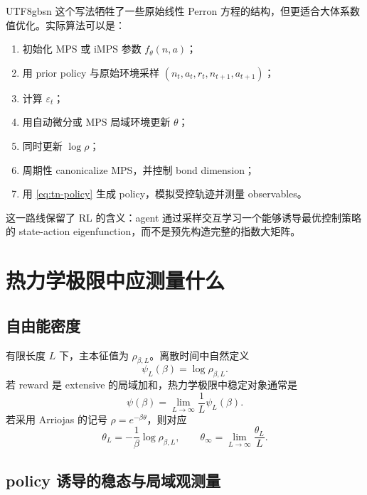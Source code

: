 \documentclass[11pt]{article}
\begin{document}
\begin{CJK*}{UTF8}{gbsn}
这个写法牺牲了一些原始线性 Perron 方程的结构，但更适合大体系数值优化。实际算法可以是：
\begin{enumerate}
    \item 初始化 MPS 或 iMPS 参数 \(f_\theta(n,a)\)；
    \item 用 prior policy 与原始环境采样 \((n_t,a_t,r_t,n_{t+1},a_{t+1})\)；
    \item 计算 \(\varepsilon_t\)；
    \item 用自动微分或 MPS 局域环境更新 \(\theta\)；
    \item 同时更新 \(\log\rho\)；
    \item 周期性 canonicalize MPS，并控制 bond dimension；
    \item 用 \eqref{eq:tn-policy} 生成 policy，模拟受控轨迹并测量 observables。
\end{enumerate}

这一路线保留了 RL 的含义：agent 通过采样交互学习一个能够诱导最优控制策略的 state-action
eigenfunction，而不是预先构造完整的指数大矩阵。

\section{热力学极限中应测量什么}

\subsection{自由能密度}

有限长度 \(L\) 下，主本征值为 \(\rho_{\beta,L}\)。离散时间中自然定义
\begin{equation}
    \psi_L(\beta)=\log\rho_{\beta,L}.
\end{equation}
若 reward 是 extensive 的局域加和，热力学极限中稳定对象通常是
\begin{equation}
    \psi(\beta)
    =
    \lim_{L\to\infty}
    \frac{1}{L}\psi_L(\beta).
    \label{eq:free-energy-density}
\end{equation}
若采用 Arriojas 的记号 \(\rho=e^{-\beta\theta}\)，则对应
\begin{equation}
    \theta_L=-\frac{1}{\beta}\log\rho_{\beta,L},
    \qquad
    \theta_\infty
    =
    \lim_{L\to\infty}\frac{\theta_L}{L}.
\end{equation}

\subsection{policy 诱导的稳态与局域观测量}


\end{CJK*}
\end{document}
